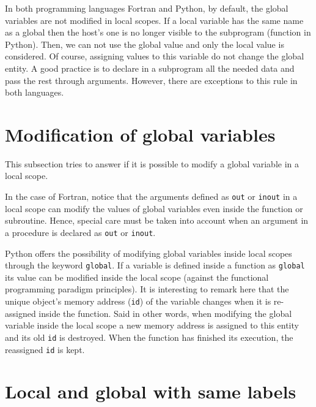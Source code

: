 In both programming languages Fortran and Python, by default, the global variables are not modified in local scopes. 
If a local variable has the same name as a global then the host's one is no longer visible to the subprogram (function in Python).
Then, we can not use the global value and only the local value is considered. 
Of course, assigning values to this variable do not change the global entity. 
A good practice is to declare in a subprogram all the needed data and pass the rest through arguments. 
However, there are exceptions to this rule in both languages. 

   
    \section{Modification of global variables}
This subsection tries to answer if it is possible to modify a global variable in a local scope. 

In the case of Fortran, notice that the arguments defined as \texttt{out} or \texttt{inout} in a local scope 
can modify the values of global variables even inside the function or subroutine. 
Hence, special care must be taken into account when an argument in a procedure is declared as \texttt{out} or \texttt{inout}.

Python offers the possibility of modifying global variables inside local scopes through the keyword \texttt{global}. 
If a variable is defined inside a function as \texttt{global} its value can be modified inside the local scope (against the functional programming paradigm principles). 
It is interesting to remark here that the unique object's memory address (\texttt{id}) of the variable changes when it is re-assigned inside the function.
Said in other words, when modifying the global variable inside the local scope a new memory address is assigned to this entity and its old \texttt{id} is destroyed. 
When the function has finished its execution, the reassigned \texttt{id} is kept. 





    \section{Local and global with same labels}









